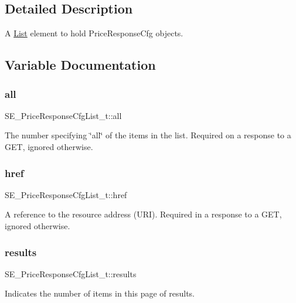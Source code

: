 \subsection{Detailed Description}
A \hyperlink{structList}{List} element to hold Price\+Response\+Cfg objects. 

\subsection{Variable Documentation}
\mbox{\label{group__PriceResponseCfgList_gafc25afa368784ecc6e17e2ff3859e3df}} 
\subsubsection{\texorpdfstring{all}{all}}
{\footnotesize\ttfamily S\+E\+\_\+\+Price\+Response\+Cfg\+List\+\_\+t\+::all}

The number specifying \char`\"{}all\char`\"{} of the items in the list. Required on a response to a G\+ET, ignored otherwise. \mbox{\label{group__PriceResponseCfgList_gaafcdf8624acc281dbf337e52d3ba7920}} 
\subsubsection{\texorpdfstring{href}{href}}
{\footnotesize\ttfamily S\+E\+\_\+\+Price\+Response\+Cfg\+List\+\_\+t\+::href}

A reference to the resource address (U\+RI). Required in a response to a G\+ET, ignored otherwise. \mbox{\label{group__PriceResponseCfgList_gafd624b9ac0b68ef68e109fea294cfda0}} 
\subsubsection{\texorpdfstring{results}{results}}
{\footnotesize\ttfamily S\+E\+\_\+\+Price\+Response\+Cfg\+List\+\_\+t\+::results}

Indicates the number of items in this page of results. 